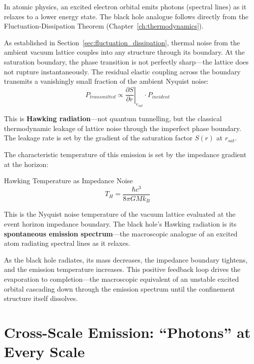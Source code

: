 In atomic physics, an excited electron orbital emits photons (spectral lines) as it relaxes to a lower energy state. The black hole analogue follows directly from the Fluctuation-Dissipation Theorem (Chapter~\ref{ch:thermodynamics}).

As established in Section~\ref{sec:fluctuation_dissipation}, thermal noise from the ambient vacuum lattice couples into any structure through its boundary. At the saturation boundary, the phase transition is not perfectly sharp---the lattice does not rupture instantaneously. The residual elastic coupling across the boundary transmits a vanishingly small fraction of the ambient Nyquist noise:
\begin{equation}
    P_{transmitted} \propto \left.\frac{\partial S}{\partial r}\right|_{r_{sat}} \cdot P_{incident}
\end{equation}

This is \textbf{Hawking radiation}---not quantum tunnelling, but the classical thermodynamic leakage of lattice noise through the imperfect phase boundary. The leakage rate is set by the gradient of the saturation factor $S(r)$ at $r_{sat}$.

The characteristic temperature of this emission is set by the impedance gradient at the horizon:
\begin{resultbox}{Hawking Temperature as Impedance Noise}
\begin{equation}
    T_H = \frac{\hbar c^3}{8\pi G M k_B}
\end{equation}
\end{resultbox}

This is the Nyquist noise temperature of the vacuum lattice evaluated at the event horizon impedance boundary. The black hole's Hawking radiation is its \textbf{spontaneous emission spectrum}---the macroscopic analogue of an excited atom radiating spectral lines as it relaxes.

\medskip
As the black hole radiates, its mass decreases, the impedance boundary tightens, and the emission temperature increases. This positive feedback loop drives the evaporation to completion---the macroscopic equivalent of an unstable excited orbital cascading down through the emission spectrum until the confinement structure itself dissolves.

\section{Cross-Scale Emission: ``Photons'' at Every Scale}
\label{sec:cross_scale_emission}

